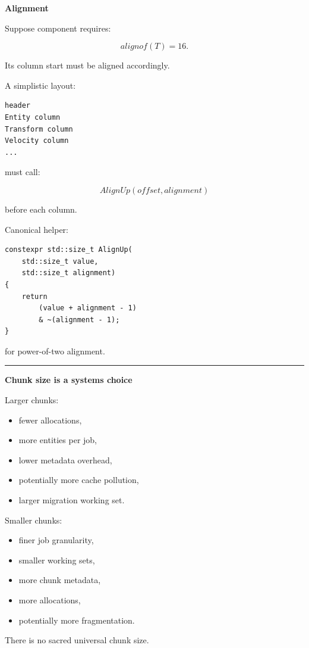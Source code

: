 \textbf{Alignment}

Suppose component requires:

\[
alignof(T)=16.
\]

Its column start must be aligned accordingly.

A simplistic layout:

\begin{verbatim}
header
Entity column
Transform column
Velocity column
...
\end{verbatim}

must call:

\[
AlignUp(offset,alignment)
\]

before each column.

Canonical helper:

\begin{verbatim}
constexpr std::size_t AlignUp(
    std::size_t value,
    std::size_t alignment)
{
    return
        (value + alignment - 1)
        & ~(alignment - 1);
}
\end{verbatim}

for power-of-two alignment.

\begin{center}\rule{0.5\linewidth}{0.5pt}\end{center}

\textbf{Chunk size is a systems choice}

Larger chunks:

\begin{itemize}
\tightlist
\item
  fewer allocations,
\item
  more entities per job,
\item
  lower metadata overhead,
\item
  potentially more cache pollution,
\item
  larger migration working set.
\end{itemize}

Smaller chunks:

\begin{itemize}
\tightlist
\item
  finer job granularity,
\item
  smaller working sets,
\item
  more chunk metadata,
\item
  more allocations,
\item
  potentially more fragmentation.
\end{itemize}

There is no sacred universal chunk size.

